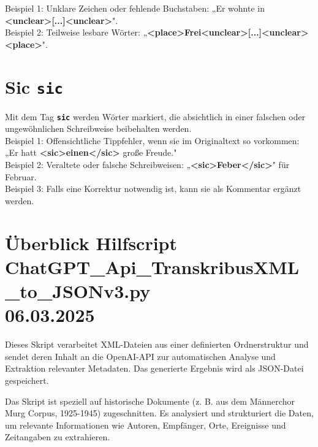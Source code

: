 \documentclass{article}
\begin{document}
\noindent{} Beispiel 1: Unklare Zeichen oder fehlende Buchstaben: „Er wohnte in \textbf{\textless unclear\textgreater [...]\textless unclear\textgreater }".\\
 Beispiel 2: Teilweise lesbare Wörter: „\textbf{\textless place\textgreater Frei\textless unclear\textgreater [...]\textless unclear\textgreater \textless place\textgreater }".\\


\section*{Sic \texttt{\textbf{{\colorbox{sic}{sic}}}}}


Mit dem Tag \texttt{\texttt{\textbf{{\colorbox{sic}{sic}}}}} werden Wörter markiert, die absichtlich in einer falschen oder ungewöhnlichen Schreibweise beibehalten werden. \\

\noindent{} Beispiel 1: Offensichtliche Tippfehler, wenn sie im Originaltext so vorkommen: „Er hatt \textbf{\textless sic\textgreater einen\textless /sic\textgreater } große Freude."\\
 Beispiel 2: Veraltete oder falsche Schreibweisen: „\textbf{\textless sic\textgreater Feber\textless /sic\textgreater }" für Februar.\\
 Beispiel 3: Falls eine Korrektur notwendig ist, kann sie als Kommentar ergänzt werden. \\


\newpage %


\section{Überblick Hilfscript\\ChatGPT\_Api\_TranskribusXML\_to\_JSONv3.py \\\small 06.03.2025}
Dieses Skript verarbeitet XML-Dateien aus einer definierten Ordnerstruktur und sendet deren Inhalt an die OpenAI-API zur automatischen Analyse und Extraktion relevanter Metadaten. Das generierte Ergebnis wird als JSON-Datei gespeichert.

Das Skript ist speziell auf historische Dokumente (z. B. aus dem Männerchor Murg Corpus, 1925-1945) zugeschnitten. Es analysiert und strukturiert die Daten, um relevante Informationen wie Autoren, Empfänger, Orte, Ereignisse und Zeitangaben zu extrahieren.
\end{document}

